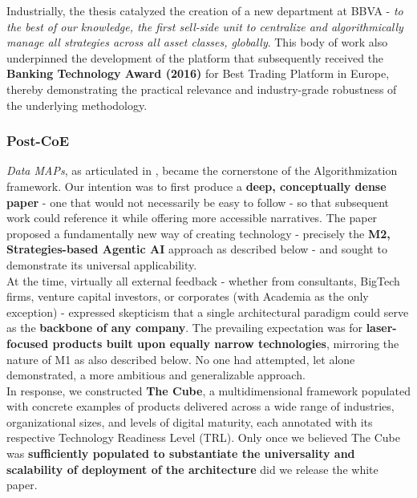 \documentclass{article}
\begin{document}
Industrially, the thesis catalyzed the creation of a new department at BBVA - \textit{to the best of our knowledge, the first sell-side unit to centralize and algorithmically manage all strategies across all asset classes, globally}. This body of work also underpinned the development of the platform that subsequently received the \textbf{Banking Technology Award (2016)} for Best Trading Platform in Europe, thereby demonstrating the practical relevance and industry-grade robustness of the underlying methodology.\\


\subsubsection{Post-CoE}
\label{subsubsection: Post-CoE}

\textit{Data MAPs}, as articulated in \cite{Data MAPs}, became the cornerstone of the Algorithmization framework. Our intention was to first produce a \textbf{deep, conceptually dense paper} - one that would not necessarily be easy to follow - so that subsequent work could reference it while offering more accessible narratives. The paper proposed a fundamentally new way of creating technology - precisely the \textbf{M2, Strategies-based Agentic AI} approach as described below - and sought to demonstrate its universal applicability.\\

At the time, virtually all external feedback - whether from consultants, BigTech firms, venture capital investors, or corporates (with Academia as the only exception) - expressed skepticism that a single architectural paradigm could serve as the \textbf{backbone of any company}. The prevailing expectation was for \textbf{laser-focused products built upon equally narrow technologies}, mirroring the nature of M1 as also described below. No one had attempted, let alone demonstrated, a more ambitious and generalizable approach.\\

In response, we constructed \textbf{The Cube}, a multidimensional framework populated with concrete examples of products delivered across a wide range of industries, organizational sizes, and levels of digital maturity, each annotated with its respective Technology Readiness Level (TRL). Only once we believed The Cube was \textbf{sufficiently populated to substantiate the universality and scalability of deployment of the architecture} did we release the white paper.\\
\end{document}
